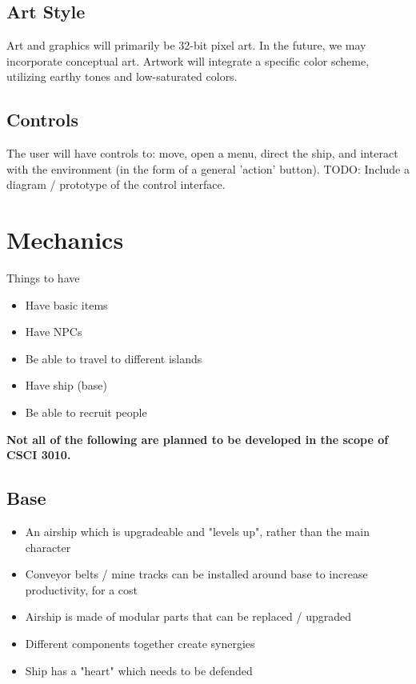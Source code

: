 \documentclass[a4paper]{scrreprt}
\begin{document}
\section{Art Style}
Art and graphics will primarily be 32-bit pixel art. In the future, we may incorporate conceptual art. Artwork will integrate a specific color scheme, utilizing earthy tones and low-saturated colors.

\section{Controls}
The user will have controls to: move, open a menu, direct the ship, and interact with the environment (in the form of a general 'action' button). TODO: Include a diagram / prototype of the control interface.



\chapter{Mechanics}

Things to have

\begin{itemize}
    \item Have basic items
    \item Have NPCs
    \item Be able to travel to different islands
    \item Have ship (base)
    \item Be able to recruit people
\end{itemize}

\textbf {Not all of the following are planned to be developed in the scope of CSCI 3010.}

\section{Base}
\begin{itemize}
\item An airship which is upgradeable and "levels up", rather than the main character
\item Conveyor belts / mine tracks can be installed around base to increase productivity, for a cost
\item Airship is made of modular parts that can be replaced / upgraded
\item Different components together create synergies
\item Ship has a "heart" which needs to be defended
\end{itemize}
\end{document}
